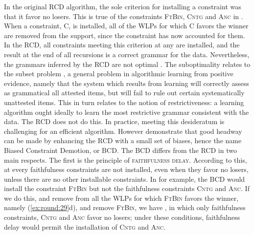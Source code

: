 \documentclass[output=paper,
modfonts
]{LSP/langsci}
\begin{document}
In the original RCD algorithm, the sole criterion for installing a constraint was that it favor no losers. This is true of the constraints \textsc{FtBin, Cntg} and \textsc{Anc} in . When a constraint, C, is installed, all of the WLPs for which C favors the winner are removed from the support, since the constraint  has now accounted for them. In the RCD, all constraints meeting this criterion at any  are installed, and the result at the end of all recursions is a correct grammar for the data. Nevertheless, the grammars inferred by the RCD are not optimal \citep{princetesar2004}. The suboptimality relates to the subset problem \citep{baker1979r,angluin1980}, a general problem in algorithmic learning from positive evidence, namely that the system which results from learning will correctly assess as grammatical all attested items, but will fail to rule out certain systematically unattested items. This in turn relates to the notion of restrictiveness: a learning algorithm ought ideally to learn the most restrictive grammar consistent with the data. The RCD does not do this. In practice, meeting this desideratum is challenging for an efficient algorithm. However \citet{princetesar2004} demonstrate that good headway can be made by enhancing the RCD with a small set of biases, hence the name Biased Constraint Demotion, or BCD. The BCD differs from the RCD in two main respects. The first is the principle of \textsc{faithfulness delay}. According to this, at every  faithfulness constraints are not installed, even when they favor no losers, unless there are no other installable constraints. In  for example, the BCD would install the  constraint \textsc{FtBin} but not the faithfulness constraints \textsc{Cntg} and \textsc{Anc}. If we do this, and remove from  all the WLPs for which \textsc{FtBin} favors the winner, namely (\ref{ex:round:29}d), and remove \textsc{FtBin}, we have , in which only faithfulness constraints, \textsc{Cntg} and \textsc{Anc} favor no losers; under these conditions, faithfulness delay would permit the installation of \textsc{Cntg} and \textsc{Anc}. 
\end{document}

